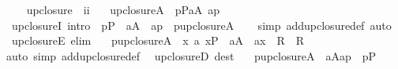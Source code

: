 \begin{isabellebody}
\isamarkupfalse%
\ \ \isanewline
\ \ upclosure\ {\isacharcolon}{\kern0pt}{\isacharcolon}{\kern0pt}\ {\isachardoublequoteopen}i{\isasymRightarrow}i{\isachardoublequoteclose}\ \isanewline
\ \ {\isachardoublequoteopen}upclosure{\isacharparenleft}{\kern0pt}A{\isacharparenright}{\kern0pt}\ {\isasymequiv}\ {\isacharbraceleft}{\kern0pt}p{\isasymin}P{\isachardot}{\kern0pt}{\isasymexists}a{\isasymin}A{\isachardot}{\kern0pt}\ a{\isasympreceq}p{\isacharbraceright}{\kern0pt}{\isachardoublequoteclose}\isanewline
\isanewline
{}\isamarkupfalse%
\ \ upclosureI\ {\isacharbrackleft}{\kern0pt}intro{\isacharbrackright}{\kern0pt}\ {\isacharcolon}{\kern0pt}\ {\isachardoublequoteopen}p{\isasymin}P\ {\isasymLongrightarrow}\ a{\isasymin}A\ {\isasymLongrightarrow}\ a{\isasympreceq}p\ {\isasymLongrightarrow}\ p{\isasymin}upclosure{\isacharparenleft}{\kern0pt}A{\isacharparenright}{\kern0pt}{\isachardoublequoteclose}\isanewline
%
\isadelimproof
\ \ %
\endisadelimproof
%
\isatagproof
{}\isamarkupfalse%
\ {\isacharparenleft}{\kern0pt}simp\ add{\isacharcolon}{\kern0pt}upclosure{\isacharunderscore}{\kern0pt}def{\isacharcomma}{\kern0pt}\ auto{\isacharparenright}{\kern0pt}%
\endisatagproof
{\isafoldproof}%
%
\isadelimproof
\isanewline
%
\endisadelimproof
\isanewline
{}\isamarkupfalse%
\ \ upclosureE\ {\isacharbrackleft}{\kern0pt}elim{\isacharbrackright}{\kern0pt}\ {\isacharcolon}{\kern0pt}\isanewline
\ \ {\isachardoublequoteopen}p{\isasymin}upclosure{\isacharparenleft}{\kern0pt}A{\isacharparenright}{\kern0pt}\ {\isasymLongrightarrow}\ {\isacharparenleft}{\kern0pt}{\isasymAnd}x\ a{\isachardot}{\kern0pt}\ x{\isasymin}P\ {\isasymLongrightarrow}\ a{\isasymin}A\ {\isasymLongrightarrow}\ a{\isasympreceq}x\ {\isasymLongrightarrow}\ R{\isacharparenright}{\kern0pt}\ {\isasymLongrightarrow}\ R{\isachardoublequoteclose}\isanewline
%
\isadelimproof
\ \ %
\endisadelimproof
%
\isatagproof
{}\isamarkupfalse%
\ {\isacharparenleft}{\kern0pt}auto\ simp\ add{\isacharcolon}{\kern0pt}upclosure{\isacharunderscore}{\kern0pt}def{\isacharparenright}{\kern0pt}%
\endisatagproof
{\isafoldproof}%
%
\isadelimproof
\isanewline
%
\endisadelimproof
\isanewline
{}\isamarkupfalse%
\ \ upclosureD\ {\isacharbrackleft}{\kern0pt}dest{\isacharbrackright}{\kern0pt}\ {\isacharcolon}{\kern0pt}\isanewline
\ \ {\isachardoublequoteopen}p{\isasymin}upclosure{\isacharparenleft}{\kern0pt}A{\isacharparenright}{\kern0pt}\ {\isasymLongrightarrow}\ {\isasymexists}a{\isasymin}A{\isachardot}{\kern0pt}{\isacharparenleft}{\kern0pt}a{\isasympreceq}p{\isacharparenright}{\kern0pt}\ {\isasymand}\ p{\isasymin}P{\isachardoublequoteclose}\isanewline

\end{isabellebody}
